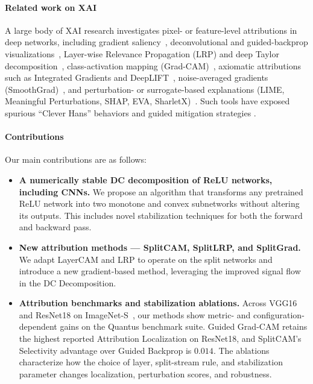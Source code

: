 \paragraph{Related work on XAI} 
A large body of XAI research investigates pixel- or feature-level attributions in deep networks, including gradient saliency~\citep{Simonyan2014}, deconvolutional and guided-backprop visualizations~\citep{ZeilerFergus2014,Springenberg2015}, Layer-wise Relevance Propagation (LRP) and deep Taylor decomposition~\citep{Bach2015,Montavon2017DeepTaylor}, class-activation mapping (Grad-CAM)~\citep{Selvaraju2017}, axiomatic attributions such as Integrated Gradients and DeepLIFT~\citep{Sundararajan2017,Shrikumar2017}, noise-averaged gradients (SmoothGrad)~\citep{Smilkov2017}, and perturbation- or surrogate-based explanations (LIME, Meaningful Perturbations, SHAP, EVA, SharletX)~\citep{Ribeiro2016,FongVedaldi2017,LundbergLee2017, Kolek2023_ShearletX, Fel2023_EVA}.
Such tools have exposed spurious “Clever Hans” behaviors and guided mitigation strategies \citep{Anders2020ClArC,Kauffmann2020CleverHans,Kauffmann2018OneClassDTD}.

\paragraph{Contributions}
Our main contributions are as follows:
\begin{itemize}
    \item \textbf{A numerically stable DC decomposition of ReLU networks, including CNNs.}
    We propose an algorithm that transforms any pretrained ReLU network into two monotone and convex subnetworks without altering its outputs. This includes novel stabilization techniques for both the forward and backward pass.
    
    \item \textbf{New attribution methods — SplitCAM, SplitLRP, and SplitGrad.}
    We adapt LayerCAM and LRP to operate on the split networks and introduce a new gradient-based method, leveraging the improved signal flow in the DC Decomposition.
    
    \item \textbf{Attribution benchmarks and stabilization ablations.}
    Across VGG16 and ResNet18 on ImageNet-S~\citep{Gao2022imagenets}, our methods show metric- and configuration-dependent gains on the Quantus benchmark suite. Guided Grad-CAM retains the highest reported Attribution Localization on ResNet18, and SplitCAM's Selectivity advantage over Guided Backprop is $0.014$. The ablations characterize how the choice of layer, split-stream rule, and stabilization parameter changes localization, perturbation scores, and robustness.
\end{itemize}
